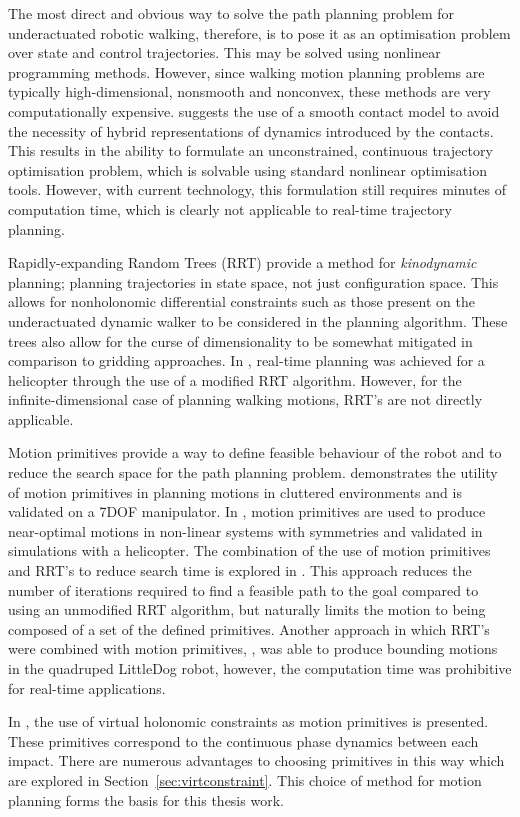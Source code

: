 The most direct and obvious way to solve the path planning problem for underactuated robotic walking, therefore, is to pose it as an optimisation problem over state and control trajectories. This may be solved using nonlinear programming methods. However, since walking motion planning problems are typically high-dimensional, nonsmooth and nonconvex, these methods are very computationally expensive. \cite{tassa2012synthesis} suggests the use of a smooth contact model to avoid the necessity of hybrid representations of dynamics introduced by the contacts. This results in the ability to formulate an unconstrained, continuous trajectory optimisation problem, which is solvable using standard nonlinear optimisation tools. However, with current technology, this formulation still requires minutes of computation time, which is clearly not applicable to real-time trajectory planning. 

Rapidly-expanding Random Trees (RRT) \cite{lavalle2001randomized} provide a method for \textit{kinodynamic} planning; planning trajectories in state space, not just configuration space. This allows for nonholonomic differential constraints such as those present on the underactuated dynamic walker to be considered in the planning algorithm. These trees also allow for the curse of dimensionality to be somewhat mitigated in comparison to gridding approaches. In \cite{frazzoli2002real}, real-time planning was achieved for a helicopter through the use of a modified RRT algorithm. However, for the infinite-dimensional case of planning walking motions, RRT's are not directly applicable. 

Motion primitives provide a way to define feasible behaviour of the robot and to reduce the search space for the path planning problem. \cite{cohen2011planning} demonstrates the utility of motion primitives in planning motions in cluttered environments and is validated on a 7DOF manipulator. In \cite{frazzoli2005maneuver}, motion primitives are used to produce near-optimal motions in non-linear systems with symmetries and validated in simulations with a helicopter. The combination of the use of motion primitives and RRT's to reduce search time is explored in \cite{vonasek2013global}. This approach reduces the number of iterations required to find a feasible path to the goal compared to using an unmodified RRT algorithm, but naturally limits the motion to being composed of a set of the defined primitives. Another approach in which RRT's were combined with motion primitives, \cite{shkolnik2011bounding}, was able to produce bounding motions in the quadruped LittleDog robot, however, the computation time was prohibitive for real-time applications. 

In \cite{manchester13planning}, the use of virtual holonomic constraints as motion primitives is presented. These primitives correspond to the continuous phase dynamics between each impact. There are numerous advantages to choosing primitives in this way which are explored in Section~\ref{sec:virtconstraint}. This choice of method for motion planning forms the basis for this thesis work.
